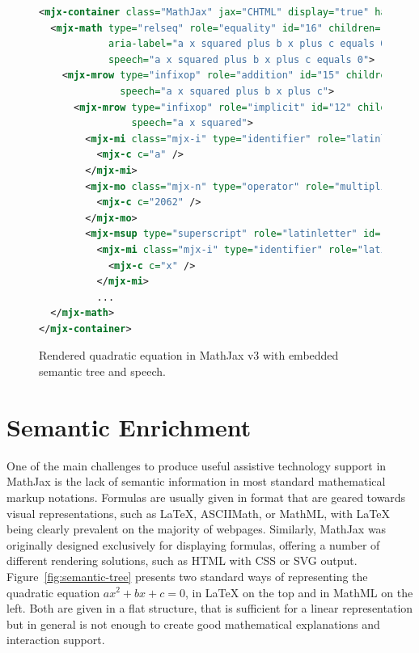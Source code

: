 \documentclass{sig-alternate}
\begin{document}
\begin{figure}[ht!]
  \begin{lstlisting}[language=XML,basicstyle=\scriptsize\tt]
<mjx-container class="MathJax" jax="CHTML" display="true" hasspeech="true" tabindex="1">
  <mjx-math type="relseq" role="equality" id="16" children="15,10" content="9"
            aria-label="a x squared plus b x plus c equals 0" 
            speech="a x squared plus b x plus c equals 0">
    <mjx-mrow type="infixop" role="addition" id="15" children="12,14,8" content="4,7" parent="16"
              speech="a x squared plus b x plus c">
      <mjx-mrow type="infixop" role="implicit" id="12" children="0,3" content="11" parent="15"
                speech="a x squared">
        <mjx-mi class="mjx-i" type="identifier" role="latinletter" font="italic" id="0" parent="12" speech="a">
          <mjx-c c="a" />
        </mjx-mi>
        <mjx-mo class="mjx-n" type="operator" role="multiplication" id="11" parent="12" speech="times">
          <mjx-c c="2062" />
        </mjx-mo>
        <mjx-msup type="superscript" role="latinletter" id="3" children="1,2" parent="12" speech="x squared">
          <mjx-mi class="mjx-i" type="identifier" role="latinletter" font="italic" id="1" parent="3" speech="x">
            <mjx-c c="x" />
          </mjx-mi>
          ...
  </mjx-math>
</mjx-container>
\end{lstlisting}
\caption{Rendered quadratic equation in MathJax v3 with embedded
  semantic tree and speech.}
\label{fig:rendered}
\end{figure}



\section{Semantic Enrichment}
\label{sec:semantic-enrichment}

One of the main challenges to produce useful assistive technology support in
MathJax is the lack of semantic information in most standard mathematical markup
notations. Formulas are usually given in format that are geared towards visual
representations, such as {\LaTeX}, ASCIIMath, or MathML, with {\LaTeX} being
clearly prevalent on the majority of webpages. Similarly, MathJax was originally
designed exclusively for displaying formulas, offering a number of different
rendering solutions, such as HTML with CSS or SVG output.
Figure~\ref{fig:semantic-tree} presents two standard ways of representing the
quadratic equation $ax^2 + bx + c = 0$, in {\LaTeX} on the top and in MathML on
the left. Both are given in a flat structure, that is sufficient for a linear
representation but in general is not enough to create good mathematical
explanations and interaction support.
\end{document}
